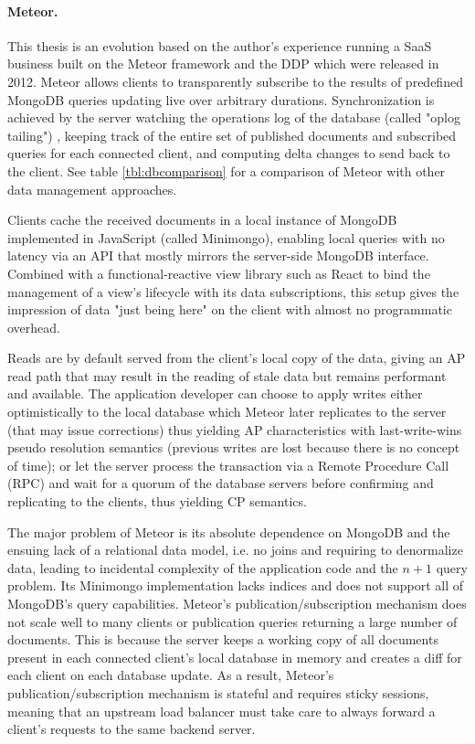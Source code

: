\paragraph{Meteor.} This thesis is an evolution based on the author's experience running a \gls{SaaS} business built on the Meteor \cite{schmidt2014live} framework and the \gls{DDP} \cite{ddpspec} which were released in 2012. Meteor allows clients to transparently subscribe to the results of predefined MongoDB queries updating live over arbitrary durations. Synchronization is achieved by the server watching the operations log of the database (called "oplog tailing") \cite{wingerath2019real}, keeping track of the entire set of published documents and subscribed queries for each connected client, and computing delta changes to send back to the client. See table \ref{tbl:dbcomparison} for a comparison of Meteor with other data management approaches.

Clients cache the received documents in a local instance of MongoDB implemented in JavaScript (called Minimongo), enabling local queries with no latency via an API that mostly mirrors the server-side MongoDB interface. Combined with a functional-reactive view library such as React to bind the management of a view's lifecycle with its data subscriptions, this setup gives the impression of data "just being here" on the client with almost no programmatic overhead.

\cleardoublepage
Reads are by default served from the client's local copy of the data, giving an AP read path that may result in the reading of stale data but remains performant and available. The application developer can choose to apply writes either optimistically to the local database which Meteor later replicates to the server (that may issue corrections) thus yielding AP characteristics with last-write-wins pseudo resolution semantics (previous writes are lost because there is no concept of time); or let the server process the transaction via a Remote Procedure Call (RPC) and wait for a quorum of the database servers before confirming and replicating to the clients, thus yielding CP semantics.

The major problem of Meteor is its absolute dependence on MongoDB and the ensuing lack of a relational data model, i.e. no joins and requiring to denormalize data, leading to incidental complexity of the application code and the $n+1$ query problem. Its Minimongo implementation lacks indices and does not support all of MongoDB's query capabilities. Meteor's publication/subscription mechanism does not scale well to many clients or publication queries returning a large number of documents. This is because the server keeps a working copy of all documents present in each connected client's local database in memory and creates a diff for each client on each database update. As a result, Meteor's publication/subscription mechanism is stateful and requires sticky sessions, meaning that an upstream load balancer must take care to always forward a client's requests to the same backend server.

